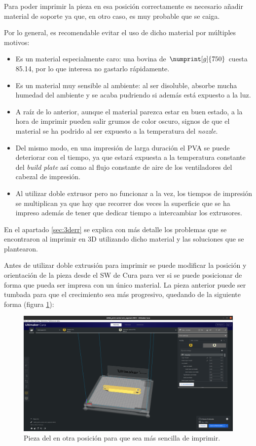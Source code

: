 Para poder imprimir la pieza en esa posición correctamente es necesario añadir material
de soporte ya que, en otro caso, es muy probable que se caiga.

Por lo general, es recomendable evitar el uso de dicho material por múltiples motivos:

\begin{itemize}
    \item Es un material especialmente caro: una bovina de $\numprint[g]{750}$ cuesta
    85.14\EUR{}, por lo que interesa no gastarlo rápidamente.

    \item Es un material muy sensible al ambiente: al ser disoluble, absorbe mucha
    humedad del ambiente y se acaba pudriendo si además está expuesto a la luz.

    \item A raíz de lo anterior, aunque el material parezca estar en buen estado, a
    la hora de imprimir pueden salir grumos de color oscuro, signos de que el material
    se ha podrido al ser expuesto a la temperatura del \textit{nozzle}.

    \item Del mismo modo, en una impresión de larga duración el \ac{PVA} se puede
    deteriorar con el tiempo, ya que estará expuesta a la temperatura constante del
    \textit{build plate} así como al flujo constante de aire de los ventiladores del
    cabezal de impresión.

    \item Al utilizar doble extrusor pero no funcionar a la vez, los tiempos de 
    impresión se multiplican ya que hay que recorrer dos veces la superficie que se
    ha impreso además de tener que dedicar tiempo a intercambiar los extrusores.
\end{itemize}

En el apartado \ref{sec:3derr} se explica con más detalle los problemas que se
encontraron al imprimir en 3D utilizando dicho material y las soluciones que se
plantearon.

Antes de utilizar doble extrusión para imprimir se puede modificar la posición
y orientación de la pieza desde el \ac{SW} de Cura para ver si se puede posicionar
de forma que pueda ser impresa con un único material. La pieza anterior puede ser
tumbada para que el crecimiento sea más progresivo, quedando de la siguiente forma
(figura \ref{fig:vpiece_2}):

\begin{figure}[H]
    \centering
    \includegraphics[width=.7\linewidth]{pictures/v_piece_2.png}
    \caption{Pieza del \pArm{} en otra posición para que sea más sencilla de imprimir.}
    \label{fig:vpiece_2}
\end{figure}

